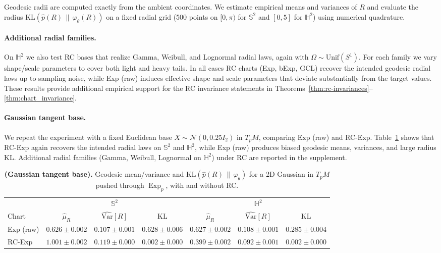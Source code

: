 \documentclass{article}
\theoremstyle{definition}
\theoremstyle{remark}
\newcommand{\SSS}{\mathbb{S}}
\newcommand{\HH}{\mathbb{H}}
\newcommand{\Exp}{\operatorname{Exp}}
\begin{document}
Geodesic radii are computed exactly from the ambient coordinates.
We estimate empirical means and variances of $R$ and evaluate the radius
$\mathrm{KL}(\widehat{p}(R)\,\|\,\varphi_\theta(R))$ on a fixed radial grid
(500 points on $[0,\pi)$ for $\SSS^2$ and $[0,5]$ for $\HH^2$) using numerical quadrature.\\

\paragraph{Additional radial families.}
On $\HH^2$ we also test RC bases that realize Gamma, Weibull, and Lognormal radial laws, again
with $\Omega \sim \mathrm{Unif}(S^1)$.
For each family we vary shape/scale parameters to cover both light and heavy tails.
In all cases RC charts (Exp, bExp, GCL) recover the intended geodesic radial laws up to
sampling noise, while Exp (raw) induces effective shape and scale parameters that deviate
substantially from the target values.
These results provide additional empirical support for the RC invariance statements in
Theorems~\ref{thm:rc-invariances}--\ref{thm:chart_invariance}.


\paragraph{Gaussian tangent base.}
We repeat the experiment with a fixed Euclidean base
$X \sim \mathcal{N}(0,0.25 I_2)$ in $T_pM$, comparing Exp (raw) and
RC-Exp.
Table~\ref{tab:E1_gaussian_expmap} shows that RC-Exp again recovers the
intended radial laws on $\SSS^2$ and $\HH^2$, while Exp (raw) produces biased
geodesic means, variances, and large radius KL.
Additional radial families (Gamma, Weibull, Lognormal on $\HH^2$) under RC
are reported in the supplement.

\begin{table}[H]
  \centering
  \caption{\textbf{(Gaussian tangent base).}
  Geodesic mean/variance and $\mathrm{KL}(\widehat p(R)\,\|\,\varphi_\theta)$ for
  a 2D Gaussian in $T_pM$ pushed through $\Exp_p$, with and without RC.}
  \label{tab:E1_gaussian_expmap}
  \begin{tabular}{lcccccc}
    \toprule
    & \multicolumn{3}{c}{$\SSS^2$} & \multicolumn{3}{c}{$\HH^2$} \\
    \cmidrule(lr){2-4} \cmidrule(lr){5-7}
    Chart
      & $\hat\mu_R$
      & $\widehat{\mathrm{Var}}[R]$
      & $\mathrm{KL}$
      & $\hat\mu_R$
      & $\widehat{\mathrm{Var}}[R]$
      & $\mathrm{KL}$ \\
    \midrule
    Exp (raw)
      & $0.626 \pm 0.002$
      & $0.107 \pm 0.001$
      & $0.628 \pm 0.006$
      & $0.627 \pm 0.002$
      & $0.108 \pm 0.001$
      & $0.285 \pm 0.004$ \\
    RC-Exp
      & $1.001 \pm 0.002$
      & $0.119 \pm 0.000$
      & $0.002 \pm 0.000$
      & $0.399 \pm 0.002$
      & $0.092 \pm 0.001$
      & $0.002 \pm 0.000$ \\
    \bottomrule
  \end{tabular}
\end{table}
\end{document}
